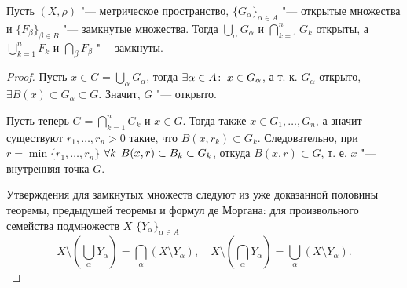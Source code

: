 \documentclass[main]{subfiles}
\begin{document}
\begin{theorem}\label{thm:metric-topolotgy}
  Пусть \( (X, \rho) \) "--- метрическое пространство,
  \( \{ G_\alpha \}_{\alpha \in A} \) "--- открытые множества
  и \( \{ F_\beta \}_{\beta \in B} \) "--- замкнутые множества.
  Тогда \( \bigcup_{\alpha} G_\alpha \) и \( \bigcap_{k = 1}^n G_k \)
  открыты, а \( \bigcup_{k = 1}^n F_k \) и \( \bigcap_{\beta} F_\beta \) "---
  замкнуты.
\end{theorem}
\begin{proof}
  Пусть \( x \in G = \bigcup_{\alpha} G_\alpha \), тогда
  \( \exists \alpha \in A \colon \: x \in G_\alpha \), а т. к. \( G_\alpha \)
  открыто, \( \exists B(x) \subset G_\alpha \subset G \).
  Значит, \( G \) "--- открыто.

  Пусть теперь \( G = \bigcap_{k = 1}^n G_k \) и \( x \in G \).
  Тогда также \( x \in G_1, \dots, G_n \), а значит
  существуют \( r_1, \dots, r_n > 0 \) такие, что
  \( B(x, r_k) \subset G_k \). Следовательно,
  при \( r = \min\{ r_1, \dots, r_n \} \)
  \( \forall {k} \; \,  B(x, r) \subset B_k \subset G_k \),
  откуда \( B(x, r) \subset G \),
  т. е. \( x \) "--- внутренняя точка \( G \).

  Утверждения для замкнутых множеств следуют из уже доказанной половины
  теоремы, предыдущей теоремы и формул де Моргана:
  для произвольного семейства подмножеств \( X \) \( \{ Y_\alpha \}_{\alpha \in A} \)
  \[
    X \setminus \left( \bigcup_\alpha Y_\alpha \right) =
    \bigcap_\alpha (X \setminus Y_\alpha),
    \quad
    X \setminus \left( \bigcap_\alpha Y_\alpha \right) =
    \bigcup_\alpha (X \setminus Y_\alpha).
  \]
\end{proof}
\end{document}
